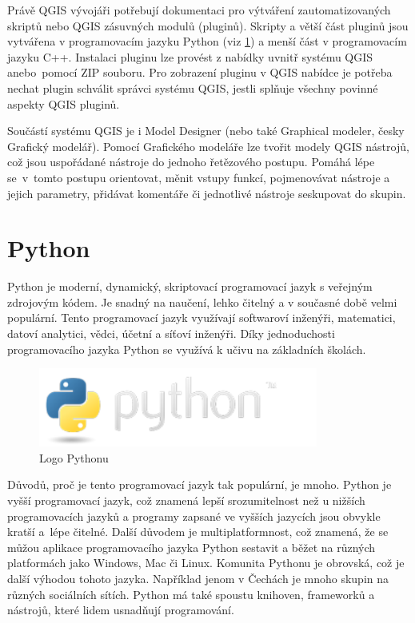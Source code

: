 Právě QGIS vývojáři potřebují dokumentaci pro výtváření zautomatizovaných skriptů nebo QGIS zásuvných modulů (pluginů).
Skripty a větší část pluginů jsou vytvářena v programovacím jazyku Python (viz \ref{section-python})
a menší část v programovacím jazyku C++. Instalaci pluginu lze provést z nabídky uvnitř systému QGIS
anebo~pomocí ZIP souboru. Pro zobrazení pluginu v QGIS nabídce je potřeba nechat plugin
schválit správci systému QGIS, jestli splňuje všechny povinné aspekty QGIS pluginů.

Součástí systému QGIS je i Model Designer (nebo také Graphical modeler, česky Grafický modelář).
Pomocí Grafického modeláře lze tvořit modely QGIS nástrojů, což jsou uspořádané nástroje do jednoho řetězového postupu.
Pomáhá lépe se~v~tomto postupu orientovat, měnit vstupy funkcí, pojmenovávat nástroje a jejich parametry,
přidávat komentáře či jednotlivé nástroje seskupovat do skupin. 

\section{Python}
\label{section-python}
Python je moderní, dynamický, skriptovací programovací jazyk s veřejným zdrojovým kódem. 
Je snadný na naučení, lehko čitelný a v současné době velmi populární. Tento programovací jazyk využívají
softwaroví inženýři, matematici, datoví analytici, vědci, účetní a síťoví inženýři.
Díky jednoduchosti programovacího jazyka Python se využívá k učivu na základních školách.

\begin{figure}[H] \centering
    \includegraphics[width=260pt]{./pictures/python-logo.png}
    \caption[Logo Pythonu]{Logo Pythonu \cite{python}}
	\label{fig:python-logo}                                
\end{figure} 

Důvodů, proč je tento programovací jazyk tak populární, je mnoho. Python je vyšší programovací jazyk,
což znamená lepší srozumitelnost než u nižších programovacích jazyků a programy zapsané
ve vyšších jazycích jsou obvykle kratší a~lépe čitelné.  Další důvodem je multiplatformnost,
což znamená, že se můžou aplikace programovacího jazyka Python sestavit a běžet na různých platformách jako 
Windows, Mac či Linux. Komunita Pythonu je obrovská, což je další výhodou tohoto jazyka.
Například jenom v Čechách je mnoho skupin na různých sociálních sítích.
Python má také spoustu knihoven, frameworků a nástrojů, které lidem usnadňují programování.

